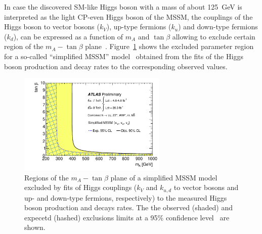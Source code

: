 In case the discovered SM-like Higgs boson with a mass of about 125~GeV is interpreted as the light CP-even Higgs boson of the MSSM, the couplings of the Higgs boson 
to vector bosons ($k_V$), up-type fermions ($k_u$) and down-type fermions ($k_d$), can be expressed as a function of  $m_A $ and $\tan\beta$
allowing to exclude certain region of the  $m_A - \tan\beta$ plane~\cite{AtlasConstraint}. Figure~\ref{fig:ex1} shows the 
excluded parameter region for a so-called ``simplified MSSM'' model~\cite{sympleMSSM1,sympleMSSM2}
obtained from the fits of the  Higgs boson production and decay rates to the corresponding observed values.

 
\begin{figure}[!tp]
     \begin{center}

            \includegraphics[width=0.63\textwidth]{figure/limits/constraintAtlas.pdf}

    \end{center}
    \caption{Regions of the  $m_A - \tan\beta$ plane of a simplified MSSM model~\cite{sympleMSSM1,sympleMSSM2} 
	excluded by fits of Higgs couplings ($k_V$ and $k_{u,d}$ to vector bosons and up- and down-type fermions, respectively)
	to the measured  Higgs boson production and decays rates. The the observed (shaded) and expecetd (hashed)  exclusions 
	limits at a 95\% confidence level~\cite{AtlasConstraint} are shown.}

   \label{fig:ex1}
\end{figure}

